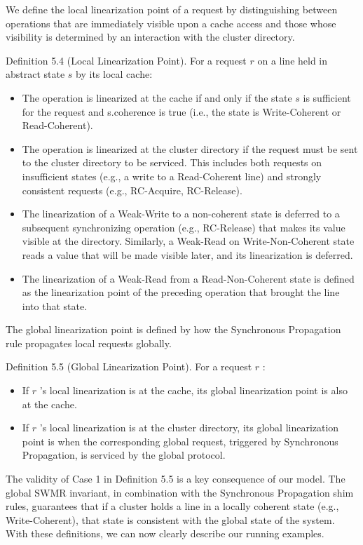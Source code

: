 \documentclass[10pt]{article}
\begin{document}
We define the local linearization point of a request by distinguishing between operations that are immediately visible upon a cache access and those whose visibility is determined by an interaction with the cluster directory.

Definition 5.4 (Local Linearization Point). For a request $r$ on a line held in abstract state $s$ by its local cache:

\begin{itemize}
  \item[(1)] The operation is linearized at the cache if and only if the state $s$ is sufficient for the request and s.coherence is true (i.e., the state is Write-Coherent or Read-Coherent).
  \item[(2)] The operation is linearized at the cluster directory if the request must be sent to the cluster directory to be serviced. This includes both requests on insufficient states (e.g., a write to a Read-Coherent line) and strongly consistent requests (e.g., RC-Acquire, RC-Release).
  \item[(3)] The linearization of a Weak-Write to a non-coherent state is deferred to a subsequent synchronizing operation (e.g., RC-Release) that makes its value visible at the directory. Similarly, a Weak-Read on Write-Non-Coherent state reads a value that will be made visible later, and its linearization is deferred.
  \item[(4)] The linearization of a Weak-Read from a Read-Non-Coherent state is defined as the linearization point of the preceding operation that brought the line into that state.
\end{itemize}

The global linearization point is defined by how the Synchronous Propagation rule propagates local requests globally.

Definition 5.5 (Global Linearization Point). For a request $r$ :

\begin{itemize}
  \item[(1)] If $r$ 's local linearization is at the cache, its global linearization point is also at the cache.
  \item[(2)] If $r$ 's local linearization is at the cluster directory, its global linearization point is when the corresponding global request, triggered by Synchronous Propagation, is serviced by the global protocol.
\end{itemize}

The validity of Case 1 in Definition 5.5 is a key consequence of our model. The global SWMR invariant, in combination with the Synchronous Propagation shim rules, guarantees that if a cluster holds a line in a locally coherent state (e.g., Write-Coherent), that state is consistent with the global state of the system. With these definitions, we can now clearly describe our running examples.
\end{document}
